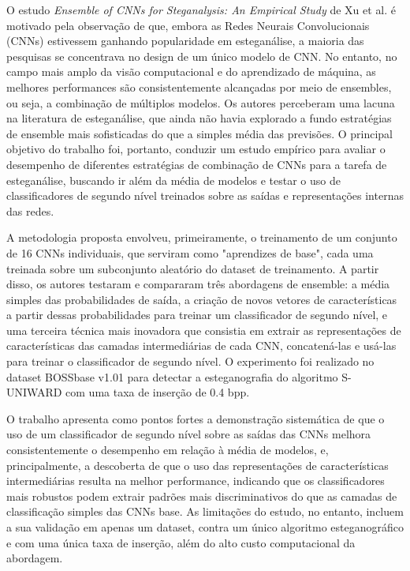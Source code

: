 \documentclass[12pt]{article}
\begin{document}
O estudo \textit{Ensemble of CNNs for Steganalysis: An Empirical Study} de Xu
et al. \cite{xu2016ensemble} é motivado pela observação de que, embora as Redes
Neurais Convolucionais (CNNs) estivessem ganhando popularidade em esteganálise,
a maioria das pesquisas se concentrava no design de um único modelo de CNN. No
entanto, no campo mais amplo da visão computacional e do aprendizado de
máquina, as melhores performances são consistentemente alcançadas por meio de
ensembles, ou seja, a combinação de múltiplos modelos. Os autores perceberam
uma lacuna na literatura de esteganálise, que ainda não havia explorado a fundo
estratégias de ensemble mais sofisticadas do que a simples média das previsões.
O principal objetivo do trabalho foi, portanto, conduzir um estudo empírico
para avaliar o desempenho de diferentes estratégias de combinação de CNNs para
a tarefa de esteganálise, buscando ir além da média de modelos e testar o uso
de classificadores de segundo nível treinados sobre as saídas e representações
internas das redes.

A metodologia proposta envolveu, primeiramente, o treinamento de um conjunto de
16 CNNs individuais, que serviram como "aprendizes de base", cada uma treinada
sobre um subconjunto aleatório do dataset de treinamento. A partir disso, os
autores testaram e compararam três abordagens de ensemble: a média simples das
probabilidades de saída, a criação de novos vetores de características a partir
dessas probabilidades para treinar um classificador de segundo nível, e uma
terceira técnica mais inovadora que consistia em extrair as representações de
características das camadas intermediárias de cada CNN, concatená-las e usá-las
para treinar o classificador de segundo nível. O experimento foi realizado no
dataset BOSSbase v1.01 para detectar a esteganografia do algoritmo S-UNIWARD
com uma taxa de inserção de 0.4 bpp.

O trabalho apresenta como pontos fortes a demonstração sistemática de que o uso
de um classificador de segundo nível sobre as saídas das CNNs melhora
consistentemente o desempenho em relação à média de modelos, e, principalmente,
a descoberta de que o uso das representações de características intermediárias
resulta na melhor performance, indicando que os classificadores mais robustos
podem extrair padrões mais discriminativos do que as camadas de classificação
simples das CNNs base. As limitações do estudo, no entanto, incluem a sua
validação em apenas um dataset, contra um único algoritmo esteganográfico e com
uma única taxa de inserção, além do alto custo computacional da abordagem.
\end{document}
